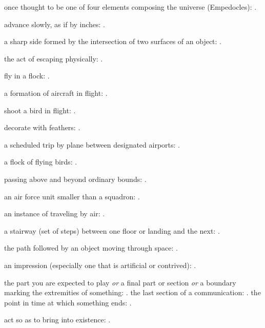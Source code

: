   once thought to be one of four elements composing the universe (Empedocles): .

  advance slowly, as if by inches:   .

  a sharp side formed by the intersection of two surfaces of an object: .

  the act of escaping physically:   .

  fly in a flock: .

  a formation of aircraft in flight: .

  shoot a bird in flight: .

  decorate with feathers:   .

  a scheduled trip by plane between designated airports: .

  a flock of flying birds: .

  passing above and beyond ordinary bounds: .

  an air force unit smaller than a squadron: .

  an instance of traveling by air:   .

  a stairway (set of steps) between one floor or landing and the next:   .

  the path followed by an object moving through space:   .

  an impression (especially one that is artificial or contrived): .

  the part you are expected to play \textit{or} a final part or section \textit{or} a boundary marking the extremities of something: . the last section of a communication:   . the point in time at which something ends:   .

  act so as to bring into existence: .

